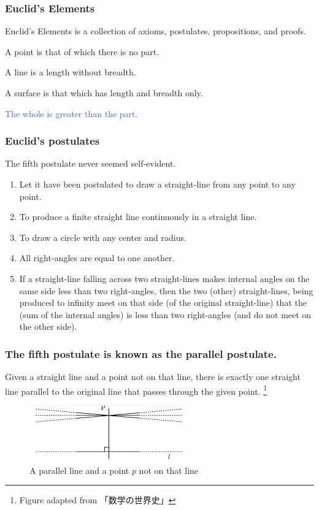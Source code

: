 \documentclass[unicode, 14pt, aspectratio=169]{beamer}
\newcommand\blfootnote[1]{%
  \begingroup
  \renewcommand\thefootnote{}\footnote{#1}%
  \addtocounter{footnote}{-1}%
  \endgroup
}
\begin{document}
\begin{frame}
  \frametitle{Euclid's Elements}
  {\large Euclid's Elements is a collection of axioms, postulates, propositions, and proofs.}
  \par
  \vspace{16pt}
  \begin{description}[leftmargin=0cm]
  \item[Definition 1] A point is that of which there is no part.
  \item[Definition 2] A line is a length without breadth.
  \item[Definition 3] A surface is that which has length and breadth only.
  \item[Axiom 5] \textcolor{highlight}{The whole is greater than the part.}
  \end{description}
\end{frame}
\begin{frame}
  \frametitle{Euclid's postulates}
  {\large The fifth postulate never seemed self-evident.}
  \par
  {\footnotesize
  \begin{enumerate}
  \item Let it have been postulated to draw a straight-line from any point to any point.
  \item To produce a finite straight line continuously in a straight line.
  \item To draw a circle with any center and radius.
  \item All right-angles are equal to one another.
  \item If a straight-line falling across two straight-lines makes internal angles on the same side less than two right-angles, then the two (other) straight-lines, being produced to infinity meet on that side (of the original straight-line) that the (sum of the internal angles) is less than two right-angles (and do not meet on the other side).
  \end{enumerate}
  }
\end{frame}
\begin{frame}
  \frametitle{The fifth postulate is known as the parallel postulate.}
  {\large Given a straight line and a point not on that line, there is exactly one straight line parallel to the original line that passes through the given point.}
  \blfootnote{Figure adapted from 「数学の世界史」\supercite{suugaku-no-sekaishi}}
  \begin{figure}
    \includegraphics[width=0.6\textwidth]{images/axiom5.png}
    \caption{A parallel line and a point $p$ not on that line}
  \end{figure}
\end{frame}
\end{document}
